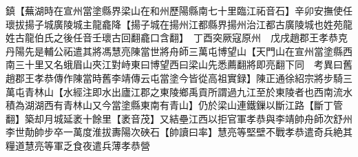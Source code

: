 鎮【蕪湖時在宣州當塗縣界梁山在和州歷陽縣南七十里臨江祏音石】辛卯安撫使任瓌拔揚子城廣陵城主龍龕降【揚子城在揚州江都縣界揚州治江都古廣陵城也姓苑龍姓古龍伯氏之後任音壬瓌古回翻龕口含翻】　丁酉突厥寇原州　戊戌趙郡王孝恭克丹陽先是輔公祏遣其將馮慧亮陳當世將舟師三萬屯博望山【天門山在宣州當塗縣西南三十里又名蛾眉山夾江對峙東曰博望西曰梁山先悉薦翻將即亮翻下同　考異曰舊趙郡王孝恭傳作陳當時舊李靖傳云屯當塗今皆從高祖實録】陳正通徐紹宗將步騎三萬屯青林山【水經注即水出廬江郡之東陵鄉禹貢所謂過九江至於東陵者也西南流水積為湖湖西有青林山又今當塗縣東南有青山】仍於梁山連鐵鏁以斷江路【斷丁管翻】築却月城延袤十餘里【袤音茂】又結壘江西以拒官軍孝恭與李靖帥舟師次舒州李世勣帥步卒一萬度淮拔夀陽次硤石【帥讀曰率】慧亮等堅壁不戰孝恭遣奇兵絶其糧道慧亮等軍乏食夜遣兵薄孝恭營